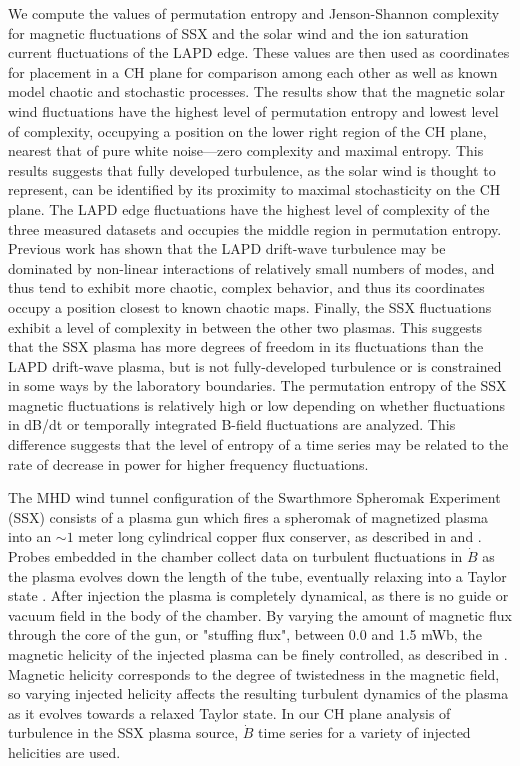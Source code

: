 \documentclass[aps,pre,twocolumn,secnumarabic,nobalancelastpage,amsmath,amssymb,
nofootinbib]{revtex4-1}
\begin{document}
We compute the values of permutation entropy and Jenson-Shannon complexity for magnetic fluctuations of SSX and the solar wind and the ion saturation current fluctuations of the LAPD edge. These values are then used as coordinates for placement in a CH plane for comparison among each other as well as known model chaotic and stochastic processes. The results show that the magnetic solar wind fluctuations have the highest level of permutation entropy and lowest level of complexity, occupying a position on the lower right region of the CH plane, nearest that of pure white noise---zero complexity and maximal entropy. This results suggests that fully developed turbulence, as the solar wind is thought to represent, can be identified by its proximity to maximal stochasticity on the CH plane. The LAPD edge fluctuations have the highest level of complexity of the three measured datasets and occupies the middle region in permutation entropy. Previous work has shown that the LAPD drift-wave turbulence may be dominated by non-linear interactions of relatively small numbers of modes, and thus tend to exhibit more chaotic, complex behavior, and thus its coordinates occupy a position closest to known chaotic maps. Finally, the SSX fluctuations exhibit a level of complexity in between the other two plasmas. This suggests that the SSX plasma has more degrees of freedom in its fluctuations than the LAPD drift-wave plasma, but is not fully-developed turbulence or is constrained in some ways by the laboratory boundaries. The permutation entropy of the SSX magnetic fluctuations is relatively high or low depending on whether fluctuations in dB/dt or temporally integrated B-field fluctuations are analyzed. This difference suggests that the level of entropy of a time series may be related to the rate of decrease in power for higher frequency fluctuations.

The MHD wind tunnel configuration of the Swarthmore Spheromak Experiment (SSX) consists of a plasma gun which fires a spheromak of magnetized plasma into an $\sim1$ meter long cylindrical copper flux conserver, as described in \cite{zhang2011} and \cite{schaffner2014}. Probes embedded in the chamber collect data on turbulent fluctuations in $\dot{B}$ as the plasma evolves down the length of the tube, eventually relaxing into a Taylor state \cite{gray2013}. After injection the plasma is completely dynamical, as there is no guide or vacuum field in the body of the chamber. By varying the amount of magnetic flux through the core of the gun, or "stuffing flux", between 0.0 and 1.5 mWb, the magnetic helicity of the injected plasma can be finely controlled, as described in \cite{schaffner2014}. Magnetic helicity corresponds to the degree of twistedness in the magnetic field, so varying injected helicity affects the resulting turbulent dynamics of the plasma as it evolves towards a relaxed Taylor state. In our CH plane analysis of turbulence in the SSX plasma source, $\dot{B}$ time series for a variety of injected helicities are used. 
\end{document}
